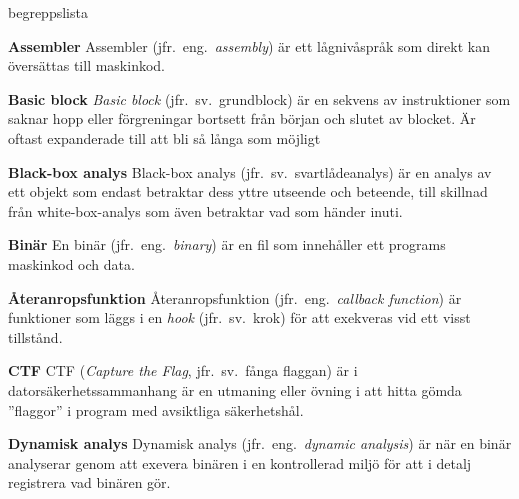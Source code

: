 \begin{labeling}{begreppslista}

    \item [\textbf{Assembler}] Assembler (jfr.\ eng.\ \emph{assembly}) är ett
    lågnivåspråk som direkt kan översättas till maskinkod.

    \item[\textbf{Basic block}] \emph{Basic block} (jfr.\ sv.\ grundblock) är en
    sekvens av instruktioner som saknar hopp eller förgreningar bortsett från
    början och slutet av blocket. Är oftast expanderade till att bli så långa
    som möjligt

    \item [\textbf{Black-box analys}] Black-box analys (jfr.\ sv.\
    svartlådeanalys) är en analys av ett objekt som endast betraktar dess
    yttre utseende och beteende, till skillnad från white-box-analys som även
    betraktar vad som händer inuti.

    \item [\textbf{Binär}] En binär (jfr.\ eng.\ \emph{binary}) är en fil som
    innehåller ett programs maskinkod och data.

    \item [\textbf{Återanropsfunktion}] Återanropsfunktion (jfr.\ eng.\
    \emph{callback function}) är funktioner som läggs i en \emph{hook} (jfr.\ sv.\ krok) för
    att exekveras vid ett visst tillstånd.


    \item [\textbf{CTF}] CTF (\emph{Capture the Flag}, jfr.\ sv.\ fånga
    flaggan) är i datorsäkerhetssammanhang är en utmaning eller övning i att
    hitta gömda ''flaggor'' i program med avsiktliga säkerhetshål.

    \item [\textbf{Dynamisk analys}] Dynamisk analys (jfr.\ eng.\ \emph{dynamic
        analysis}) är när en binär analyserar genom att exevera binären i en
    kontrollerad miljö för att i detalj registrera vad binären gör.


\end{labeling}
